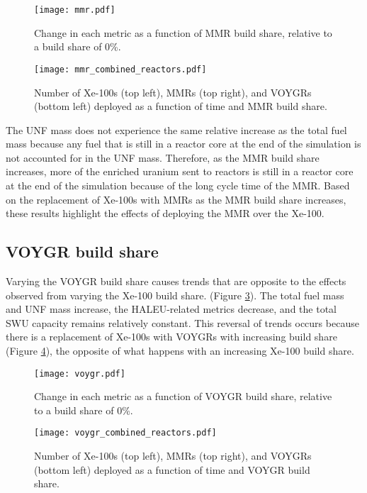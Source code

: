 \begin{figure}[h!]
    \centering
    \texttt{[image: mmr.pdf]}
    \caption{Change in each metric as a function of MMR build share, 
    relative to a build share of 0\%.}
    \label{fig:mmr_scenario7}
\end{figure}


\begin{figure}[h!]
    \centering
    \texttt{[image: mmr\_combined\_reactors.pdf]}
    \caption{Number of Xe-100s (top left), MMRs (top right), and 
    VOYGRs (bottom left) deployed as a function of time and 
    MMR build share.}
    \label{fig:mmr_reactors_s7}
\end{figure}

The \gls{UNF} mass does not experience the same 
relative increase as the total fuel mass because any fuel that is still in a 
reactor core at the end of the simulation is not accounted for in the 
\gls{UNF} mass. Therefore, as the \gls{MMR} build share increases, more 
of the enriched uranium sent to reactors is still in a reactor core
at the end of the simulation because of the long cycle time of the 
\gls{MMR}. 
Based on the replacement of Xe-100s with \glspl{MMR} as the \gls{MMR} 
build share increases, these results highlight the effects of deploying the
\gls{MMR} over the Xe-100. 

\subsection{VOYGR build share}
Varying the VOYGR build share causes trends that are opposite 
to the effects observed from varying the Xe-100 build share. 
(Figure 
\ref{fig:voygr_scenario7}). The total fuel mass and \gls{UNF} mass 
increase, the \gls{HALEU}-related metrics decrease, and the total 
\gls{SWU} capacity remains relatively constant. This reversal 
of trends occurs because there is a replacement of Xe-100s with VOYGRs
with increasing build share (Figure \ref{fig:voygr_reactors_s7}), 
the opposite of what happens with an increasing Xe-100 build share. 

\begin{figure}[h!]
    \centering
    \texttt{[image: voygr.pdf]}
    \caption{Change in each metric as a function of VOYGR build share, 
    relative to a build share of 0\%.}
    \label{fig:voygr_scenario7}
\end{figure}

\begin{figure}[h!]
    \centering
    \texttt{[image: voygr\_combined\_reactors.pdf]}
    \caption{Number of Xe-100s (top left), MMRs (top right), and 
    VOYGRs (bottom left) deployed as a function of time and 
    VOYGR build share.}
    \label{fig:voygr_reactors_s7}
\end{figure}

